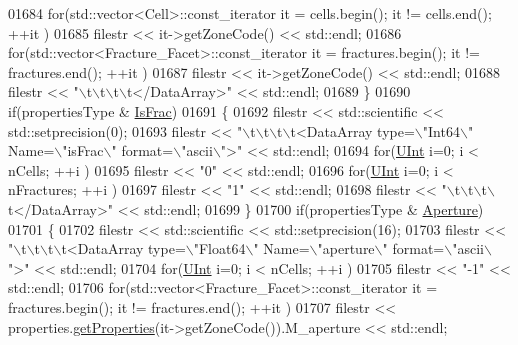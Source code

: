 \begin{DoxyCode}
01684         \textcolor{keywordflow}{for}(std::vector<Cell>::const\_iterator it = cells.begin(); it != cells.end(); ++it )
01685             filestr << it->getZoneCode() << std::endl;
01686         \textcolor{keywordflow}{for}(std::vector<Fracture\_Facet>::const\_iterator it = fractures.begin(); it != fractures.end(); ++it
       )
01687             filestr << it->getZoneCode() << std::endl;
01688         filestr << \textcolor{stringliteral}{"\(\backslash\)t\(\backslash\)t\(\backslash\)t\(\backslash\)t</DataArray>"} << std::endl;
01689     \}
01690     \textcolor{keywordflow}{if}(propertiesType & \hyperlink{namespaceFVCode3D_ab3abc77722284ce4344be90bb61c1a41ad2b21a53311e3478541b39809a3877b9}{IsFrac})
01691     \{
01692         filestr << std::scientific << std::setprecision(0);
01693         filestr << \textcolor{stringliteral}{"\(\backslash\)t\(\backslash\)t\(\backslash\)t\(\backslash\)t<DataArray type=\(\backslash\)"Int64\(\backslash\)" Name=\(\backslash\)"isFrac\(\backslash\)" format=\(\backslash\)"ascii\(\backslash\)">"} << std::endl;
01694         \textcolor{keywordflow}{for}(\hyperlink{namespaceFVCode3D_a4bf7e328c75d0fd504050d040ebe9eda}{UInt} i=0; i < nCells; ++i )
01695             filestr << \textcolor{stringliteral}{"0"} << std::endl;
01696         \textcolor{keywordflow}{for}(\hyperlink{namespaceFVCode3D_a4bf7e328c75d0fd504050d040ebe9eda}{UInt} i=0; i < nFractures; ++i )
01697             filestr << \textcolor{stringliteral}{"1"} << std::endl;
01698         filestr << \textcolor{stringliteral}{"\(\backslash\)t\(\backslash\)t\(\backslash\)t\(\backslash\)t</DataArray>"} << std::endl;
01699     \}
01700     \textcolor{keywordflow}{if}(propertiesType & \hyperlink{namespaceFVCode3D_ab3abc77722284ce4344be90bb61c1a41a7bea6d441c4661b396fc86912312c47e}{Aperture})
01701     \{
01702         filestr << std::scientific << std::setprecision(16);
01703         filestr << \textcolor{stringliteral}{"\(\backslash\)t\(\backslash\)t\(\backslash\)t\(\backslash\)t<DataArray type=\(\backslash\)"Float64\(\backslash\)" Name=\(\backslash\)"aperture\(\backslash\)" format=\(\backslash\)"ascii\(\backslash\)">"} << std::endl;
01704         \textcolor{keywordflow}{for}(\hyperlink{namespaceFVCode3D_a4bf7e328c75d0fd504050d040ebe9eda}{UInt} i=0; i < nCells; ++i )
01705             filestr << \textcolor{stringliteral}{"-1"} << std::endl;
01706         \textcolor{keywordflow}{for}(std::vector<Fracture\_Facet>::const\_iterator it = fractures.begin(); it != fractures.end(); ++it
       )
01707             filestr << properties.\hyperlink{classFVCode3D_1_1PropertiesMap_ace888d15c9a4ab13d5e217a3a565604c}{getProperties}(it->getZoneCode()).M\_aperture << std::endl;

\end{DoxyCode}
